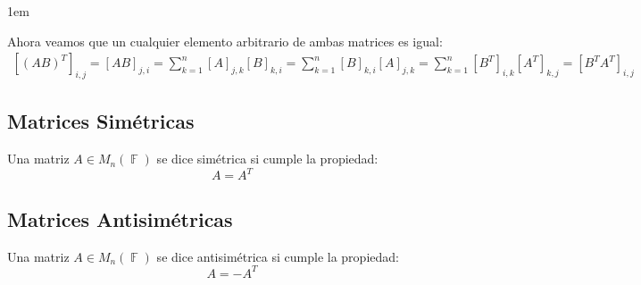 \documentclass[12pt, fleqn]{report}                             %
\newenvironment{SmallIndentation}[1][0.75em]                    %
        {\begin{adjustwidth}{#1}{}\begin{footnotesize}}             %
        {\end{footnotesize}\end{adjustwidth}}                       %
\theoremstyle{break}                                            %
\DeclareMathOperator \GenericField {\mathbb{F}}                 %
\newcommand{\Brackets}[1]{\left[ #1 \right]}                    %
\begin{document}
\begin{itemize}
\begin{SmallIndentation}[1em]
                            Ahora veamos que un cualquier elemento arbitrario de ambas matrices es igual:
                            \begin{equation*}
                            \begin{split}
                                [(AB)^T]_{i, j}     
                                    = [AB]_{j, i}
                                    = \sum_{k = 1}^n [A]_{j, k} [B]_{k, i} 
                                    = \sum_{k = 1}^n [B]_{k, i} [A]_{j, k}   
                                    = \sum_{k = 1}^n [B^T]_{i, k} [A^T]_{k, j}            
                                    = \Brackets{B^T A^T}_{i, j}
                            \end{split}
                            \end{equation*}

                        \end{SmallIndentation}

                \end{itemize}



                        
            \clearpage
            \subsection{Matrices Simétricas}

                Una matriz $A \in M_n(\GenericField)$ se dice simétrica si cumple la propiedad:
                \begin{equation*}
                    A = A^T
                \end{equation*}



            \vspace{1em}
            \subsection{Matrices Antisimétricas}

                Una matriz $A \in M_n(\GenericField)$ se dice antisimétrica si cumple la propiedad:
                \begin{equation*}
                    A = -A^T
                \end{equation*}
\end{document}
